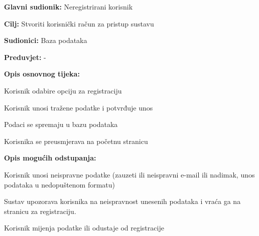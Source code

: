 				\noindent {}
				\begin{packed_item}
					
					\item \textbf{Glavni sudionik:} Neregistrirani korisnik
					\item  \textbf{Cilj:} Stvoriti korisnički račun za pristup sustavu
					\item  \textbf{Sudionici:} Baza podataka
					\item  \textbf{Preduvjet:} -
					\item  \textbf{Opis osnovnog tijeka:}
					
					\item[] \begin{packed_enum}
						
						\item Korisnik odabire opciju za registraciju
						\item Korisnik unosi tražene podatke i potvrđuje unos
						\item Podaci se spremaju u bazu podataka
						\item Korisnika se preusmjerava na početnu stranicu
						
					\end{packed_enum}
					
					\item  \textbf{Opis mogućih odstupanja:}
					
					\item[] \begin{packed_item}
						
						\item[2.a] Korisnik unosi neispravne podatke (zauzeti ili neispravni e-mail ili nadimak, unos podataka u nedopuštenom formatu)
						\item[] \begin{packed_enum}
							
							\item Sustav upozorava korisnika na neispravnost unesenih podataka i vraća ga na stranicu za registraciju.
							\item Korisnik mijenja podatke ili odustaje od registracije
							
						\end{packed_enum}
					\end{packed_item}
				\end{packed_item}
				
